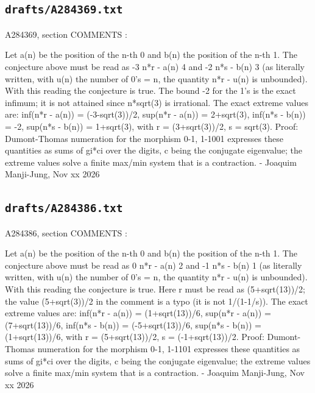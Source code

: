 \subsection*{\texttt{drafts/A284369.txt}}
{\small\raggedright\ttfamily
A284369, section COMMENTS :\par
\par
Let a(n) be the position of the n-th 0 and b(n) the position of the n-th 1. The conjecture above must be read as -3  n*r - a(n)  4 and -2  n*s - b(n)  3 (as literally written, with u(n) the number of 0's = n, the quantity n*r - u(n) is unbounded). With this reading the conjecture is true. The bound -2 for the 1's is the exact infimum; it is not attained since n*sqrt(3) is irrational. The exact extreme values are: inf(n*r - a(n)) = (-3-sqrt(3))/2, sup(n*r - a(n)) = 2+sqrt(3), inf(n*s - b(n)) = -2, sup(n*s - b(n)) = 1+sqrt(3), with r = (3+sqrt(3))/2, s = sqrt(3). Proof: Dumont-Thomas numeration for the morphism 0-1, 1-1001 expresses these quantities as sums of gi*ci over the digits, c being the conjugate eigenvalue; the extreme values solve a finite max/min system that is a contraction. - Joaquim Manji-Jung, Nov xx 2026\par
}
\subsection*{\texttt{drafts/A284386.txt}}
{\small\raggedright\ttfamily
A284386, section COMMENTS :\par
\par
Let a(n) be the position of the n-th 0 and b(n) the position of the n-th 1. The conjecture above must be read as 0  n*r - a(n)  2 and -1  n*s - b(n)  1 (as literally written, with u(n) the number of 0's = n, the quantity n*r - u(n) is unbounded). With this reading the conjecture is true. Here r must be read as (5+sqrt(13))/2; the value (5+sqrt(3))/2 in the comment is a typo (it is not 1/(1-1/s)). The exact extreme values are: inf(n*r - a(n)) = (1+sqrt(13))/6, sup(n*r - a(n)) = (7+sqrt(13))/6, inf(n*s - b(n)) = (-5+sqrt(13))/6, sup(n*s - b(n)) = (1+sqrt(13))/6, with r = (5+sqrt(13))/2, s = (-1+sqrt(13))/2. Proof: Dumont-Thomas numeration for the morphism 0-1, 1-1101 expresses these quantities as sums of gi*ci over the digits, c being the conjugate eigenvalue; the extreme values solve a finite max/min system that is a contraction. - Joaquim Manji-Jung, Nov xx 2026\par
}
